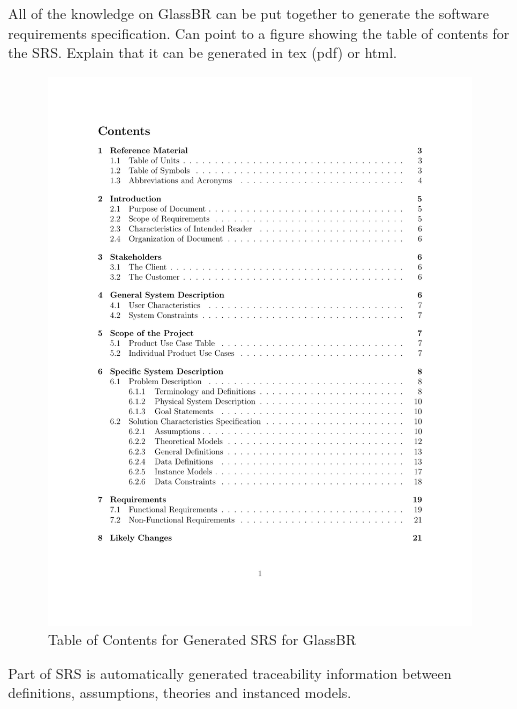 \documentclass[sigconf]{acmart}
\begin{document}
All of the knowledge on GlassBR can be put together to generate the software
requirements specification.  Can point to a figure showing the table of contents
for the SRS.  Explain that it can be generated in tex (pdf) or html.

\begin{figure}[htpb]
\begin{center}
\includegraphics[scale=0.45]{./figures/TofC.pdf}
\end{center}
\caption{Table of Contents for Generated SRS for GlassBR}
\label{Fig_JtolDrasil}
\end{figure}

Part of SRS is automatically generated traceability information between
definitions, assumptions, theories and instanced models.
\end{document}
